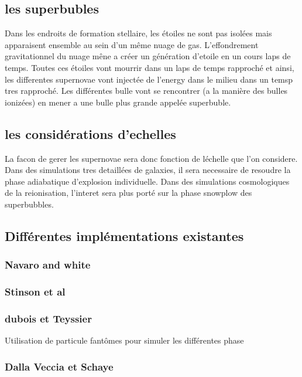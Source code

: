 \subsection{les superbubles}
Dans les endroits de formation stellaire, les étoiles ne sont pas isolées mais apparaisent ensemble au sein d'un même nuage de gas.
L'effondrement gravitationnel du nuage mêne a créer un génération d'etoile en un cours laps de temps.
Toutes ces étoiles vont mourrir dans un laps de temps rapproché et ainsi, les differentes supernovae vont injectée de l'energy dans le milieu dans un temsp tres rapproché.
Les différentes bulle vont se rencontrer (a la manière des bulles ionizées) en mener a une bulle plus grande appelée superbuble.


\subsection{les considérations d'echelles}
La facon de gerer les supernovae sera donc fonction de léchelle que l'on considere.
Dans des simulations tres detaillées de galaxies, il sera necessaire de resoudre la phase adiabatique d'explosion individuelle.
Dans des simulations cosmologiques de la reionisation, l'interet sera plus porté sur la phase snowplow des superbubbles.


\subsection{ Différentes implémentations existantes}



\subsubsection{Navaro and white}


\subsubsection{Stinson et al}



\subsubsection{dubois et Teyssier}

Utilisation de particule fantômes pour simuler les différentes phase

\subsubsection{Dalla Veccia et Schaye}


